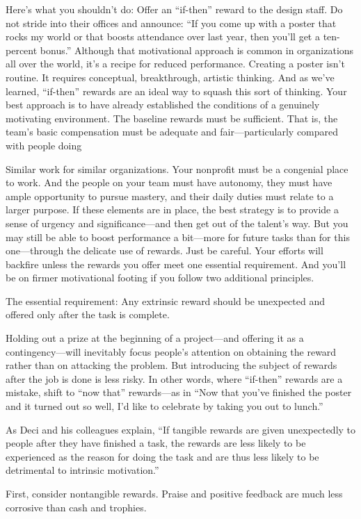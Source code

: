 Here’s what you shouldn’t do: Offer an “if-then” reward to the design staff. Do not stride into their offices and announce: “If you come up with a poster that rocks my world or that boosts attendance over last year, then you’ll get a ten-percent bonus.” Although that motivational approach is common in organizations all over the world, it’s a recipe for reduced performance. Creating a poster isn’t routine. It requires conceptual, breakthrough, artistic thinking. And as we’ve learned, “if-then” rewards are an ideal way to squash this sort of thinking.
Your best approach is to have already established the conditions of a genuinely motivating environment. The baseline rewards must be sufficient. That is, the team’s basic compensation must be adequate and fair—particularly compared with people doing

Similar work for similar organizations. Your nonprofit must be a congenial place to work. And the people on your team must have autonomy, they must have ample opportunity to pursue mastery, and their daily duties must relate to a larger purpose. If these elements are in place, the best strategy is to provide a sense of urgency and significance—and then get out of the talent’s way.
But you may still be able to boost performance a bit—more for future tasks than for this one—through the delicate use of rewards. Just be careful. Your efforts will backfire unless the rewards you offer meet one essential requirement. And you’ll be on firmer motivational footing if you follow two additional principles.

The essential requirement: Any extrinsic reward should be unexpected and offered only after the task is complete.

Holding out a prize at the beginning of a project—and offering it as a contingency—will inevitably focus people’s attention on obtaining the reward rather than on attacking the problem. But introducing the subject of rewards after the job is done is less risky.
In other words, where “if-then” rewards are a mistake, shift to “now that” rewards—as in “Now that you’ve finished the poster and it turned out so well, I’d like to celebrate by taking you out to lunch.”

As Deci and his colleagues explain, “If tangible rewards are given unexpectedly to people after they have finished a task, the rewards are less likely to be experienced as the reason for doing the task and are thus less likely to be detrimental to intrinsic motivation.”

First, consider nontangible rewards. Praise and positive feedback are much less corrosive than cash and trophies.

